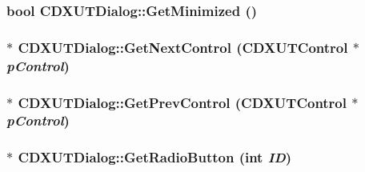 \hypertarget{class_c_d_x_u_t_dialog_a67ac00efe88bc892a832d000960be4b6}{
\subsubsection[{GetMinimized}]{\setlength{\rightskip}{0pt plus 5cm}bool CDXUTDialog::GetMinimized ()}}
\label{class_c_d_x_u_t_dialog_a67ac00efe88bc892a832d000960be4b6}
\hypertarget{class_c_d_x_u_t_dialog_a296f861718f43a5a5ec0d112094f5cc0}{
\subsubsection[{GetNextControl}]{ $\ast$ CDXUTDialog::GetNextControl ({\bf CDXUTControl} $\ast$ {\em pControl})}}
\label{class_c_d_x_u_t_dialog_a296f861718f43a5a5ec0d112094f5cc0}
\hypertarget{class_c_d_x_u_t_dialog_ac0999d1694204b66f86a85f117e2a2da}{
\subsubsection[{GetPrevControl}]{ $\ast$ CDXUTDialog::GetPrevControl ({\bf CDXUTControl} $\ast$ {\em pControl})}}
\label{class_c_d_x_u_t_dialog_ac0999d1694204b66f86a85f117e2a2da}
\hypertarget{class_c_d_x_u_t_dialog_a346d360fc897ec736800dfcf86ca205c}{
\subsubsection[{GetRadioButton}]{$\ast$ CDXUTDialog::GetRadioButton ({\bf int} {\em ID})}}
\label{class_c_d_x_u_t_dialog_a346d360fc897ec736800dfcf86ca205c}
